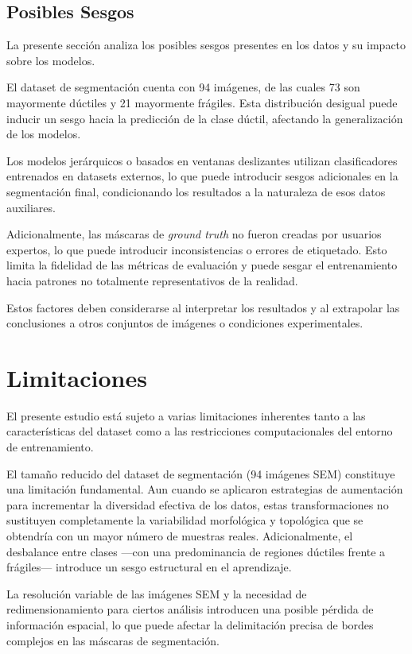 \documentclass[onecolumn, 12pt , journal]{IEEEtran}
\begin{document}
\subsection{Posibles Sesgos}

La presente sección analiza los posibles sesgos presentes en los datos y su impacto sobre los modelos.

El dataset de segmentación cuenta con 94 imágenes, de las cuales 73 son mayormente dúctiles y 21 mayormente frágiles. Esta distribución desigual puede inducir un sesgo hacia la predicción de la clase dúctil, afectando la generalización de los modelos.

Los modelos jerárquicos o basados en ventanas deslizantes utilizan clasificadores entrenados en datasets externos, lo que puede introducir sesgos adicionales en la segmentación final, condicionando los resultados a la naturaleza de esos datos auxiliares.

Adicionalmente, las máscaras de \emph{ground truth} no fueron creadas por usuarios expertos, lo que puede introducir inconsistencias o errores de etiquetado. Esto limita la fidelidad de las métricas de evaluación y puede sesgar el entrenamiento hacia patrones no totalmente representativos de la realidad.

Estos factores deben considerarse al interpretar los resultados y al extrapolar las conclusiones a otros conjuntos de imágenes o condiciones experimentales.


\section{Limitaciones}

El presente estudio está sujeto a varias limitaciones inherentes tanto a las características del dataset como a las restricciones computacionales del entorno de entrenamiento.

El tamaño reducido del dataset de segmentación (94 imágenes SEM) constituye una limitación fundamental. Aun cuando se aplicaron estrategias de aumentación para incrementar la diversidad efectiva de los datos, estas transformaciones no sustituyen completamente la variabilidad morfológica y topológica que se obtendría con un mayor número de muestras reales. Adicionalmente, el desbalance entre clases —con una predominancia de regiones dúctiles frente a frágiles— introduce un sesgo estructural en el aprendizaje.

La resolución variable de las imágenes SEM y la necesidad de redimensionamiento para ciertos análisis introducen una posible pérdida de información espacial, lo que puede afectar la delimitación precisa de bordes complejos en las máscaras de segmentación.
\end{document}
